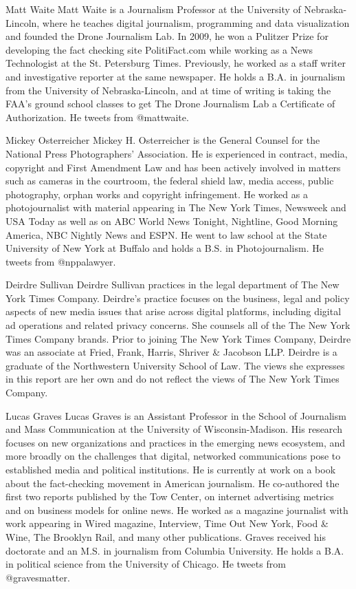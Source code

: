 Matt Waite
Matt Waite is a Journalism Professor at the University of Nebraska-Lincoln,
where he teaches digital journalism, programming and data visualization
and founded the Drone Journalism Lab.
In 2009, he won a Pulitzer Prize for developing the fact checking site
PolitiFact.com while working as a News Technologist at the St. Petersburg
Times. Previously, he worked as a staff writer and investigative reporter at
the same newspaper.
He holds a B.A. in journalism from the University of Nebraska-Lincoln, and
at time of writing is taking the FAA's ground school classes to get The Drone
Journalism Lab a Certificate of Authorization.
He tweets from @mattwaite.


Mickey Osterreicher
Mickey H. Osterreicher is the General Counsel for the National Press Photographers'
Association. He is experienced in contract, media, copyright
and First Amendment Law and has been actively involved in matters such
as cameras in the courtroom, the federal shield law, media access, public
photography, orphan works and copyright infringement.
He worked as a photojournalist with material appearing in The New York
Times, Newsweek and USA Today as well as on ABC World News Tonight,
Nightline, Good Morning America, NBC Nightly News and ESPN.
He went to law school at the State University of New York at Buffalo and
holds a B.S. in Photojournalism.
He tweets from @nppalawyer.


Deirdre Sullivan
Deirdre Sullivan practices in the legal department of The New York
Times Company.
Deirdre's practice focuses on the business, legal and policy aspects of new
media issues that arise across digital platforms, including digital ad operations
and related privacy concerns. She counsels all of the The New York
Times Company brands.
Prior to joining The New York Times Company, Deirdre was an associate at
Fried, Frank, Harris, Shriver & Jacobson LLP.
Deirdre is a graduate of the Northwestern University School of Law.
The views she expresses in this report are her own and do not reflect the
views of The New York Times Company.


Lucas Graves
Lucas Graves is an Assistant Professor in the School of Journalism and
Mass Communication at the University of Wisconsin-Madison. His
research focuses on new organizations and practices in the emerging news
ecosystem, and more broadly on the challenges that digital, networked
communications pose to established media and political institutions.
He is currently at work on a book about the fact-checking movement in
American journalism.
He co-authored the first two reports published by the Tow Center, on
internet advertising metrics and on business models for online news. He
worked as a magazine journalist with work appearing in Wired magazine,
Interview, Time Out New York, Food & Wine, The Brooklyn Rail, and many
other publications.
Graves received his doctorate and an M.S. in journalism from Columbia
University. He holds a B.A. in political science from the University
of Chicago.
He tweets from @gravesmatter.



